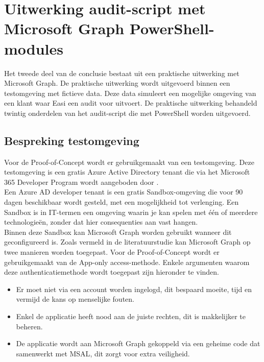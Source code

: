 
\chapter{Uitwerking audit-script met Microsoft Graph PowerShell-modules}%
\label{ch:poc}


Het tweede deel van de conclusie bestaat uit een praktische uitwerking met Microsoft Graph. De praktische uitwerking wordt uitgevoerd binnen een testomgeving met fictieve data. Deze data simuleert een mogelijke omgeving van een klant waar Easi een audit voor uitvoert. De praktische uitwerking behandeld twintig onderdelen van het audit-script die met PowerShell worden uitgevoerd.

\section{Bespreking testomgeving}

Voor de Proof-of-Concept wordt er gebruikgemaakt van een testomgeving. Deze testomgeving is een gratis Azure Active Directory tenant die via het Microsoft 365 Developer Program wordt aangeboden door \textcite{Microsoft2023q}. \\

Een Azure \ac{AD} developer tenant is een gratis Sandbox-omgeving die voor 90 dagen beschikbaar wordt gesteld, met een mogelijkheid tot verlenging. Een Sandbox is in \ac{IT}-termen een omgeving waarin je kan spelen met één of meerdere technologieën, zonder dat hier consequenties aan vast hangen. \\

Binnen deze Sandbox kan Microsoft Graph worden gebruikt wanneer dit  geconfigureerd is. Zoals vermeld in de literatuurstudie kan Microsoft Graph op twee manieren worden toegepast. Voor de Proof-of-Concept wordt er gebruikgemaakt van de App-only access-methode. Enkele argumenten waarom deze authenticatiemethode wordt toegepast zijn hieronder te vinden. 

\begin{itemize}
    \item Er moet niet via een account worden ingelogd, dit bespaard moeite, tijd en vermijd de kans op menselijke fouten.
    \item Enkel de applicatie heeft nood aan de juiste rechten, dit is makkelijker te beheren.
    \item De applicatie wordt aan Microsoft Graph gekoppeld via een geheime code dat samenwerkt met \ac{MSAL}, dit zorgt voor extra veiligheid.
\end{itemize}

